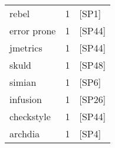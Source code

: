 \begin{tabular}{lrl}
               rebel &      1 &                                            [SP1] \\
         error prone &      1 &                                           [SP44] \\
            jmetrics &      1 &                                           [SP44] \\
               skuld &      1 &                                           [SP48] \\
              simian &      1 &                                            [SP6] \\
            infusion &      1 &                                           [SP26] \\
          checkstyle &      1 &                                           [SP44] \\
             archdia &      1 &                                            [SP4] \\
\bottomrule
\end{tabular}
